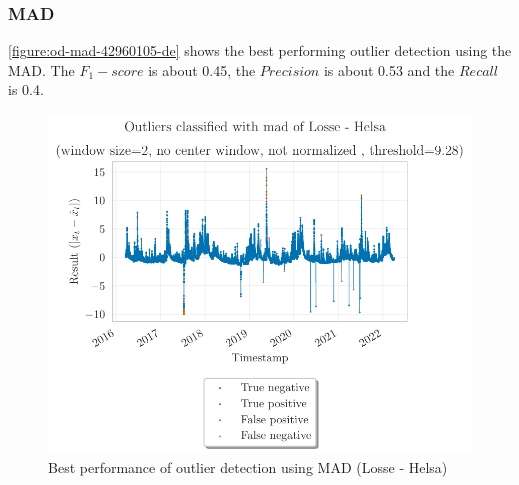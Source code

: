 \subsubsection{MAD}
\autoref{figure:od-mad-42960105-de} shows the best performing outlier detection using the \ac{MAD}. The $F_1-score$ is about 0.45, the $Precision$ is about 0.53 and the $Recall$ is 0.4. 
\begin{figure}[H]
    \centering 
    \includegraphics{plots/pdfs/42960105-de/od_mad_42960105-de_all.pdf}
    \caption{Best performance of outlier detection using \ac{MAD} (Losse - Helsa)}
    \label{figure:od-mad-42960105-de}
\end{figure}
\clearpage
